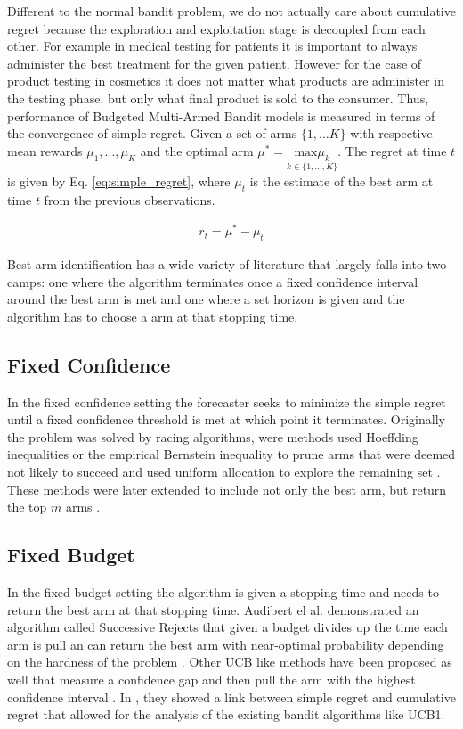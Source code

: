 \documentclass[letterpaper, 10 pt, conference]{ieeeconf}  %
\begin{document}
Different to the normal bandit problem, we do not actually care about cumulative regret because the exploration and exploitation stage is decoupled from each other. For example in medical testing for patients it is important to always administer the best treatment for the given patient. However for the case of product testing in cosmetics it does not matter what products are administer in the testing phase, but only what final product is sold to the consumer. Thus, performance of Budgeted Multi-Armed Bandit models is measured in terms of the convergence of simple regret. Given a set of arms $\lbrace 1,...K \rbrace$ with respective mean rewards $\mu_1, ..., \mu_K$ and the optimal arm $\mu^* = \underset{k\in\lbrace 1, ..., K \rbrace}{\mbox{max}\mu_k}$. The regret at time $t$ is given by Eq. \ref{eq:simple_regret}, where $\mu_t$ is the estimate of the best arm at time $t$ from the previous observations. 

\vspace{-2ex}
\begin{align}\label{eq:simple_regret}
r_t = \mu^* - \mu_t
\end{align}

Best arm identification has a wide variety of literature that largely falls into two camps: one where the algorithm terminates once a fixed confidence interval around the best arm is met and one where a set horizon is given and the algorithm has to choose a arm at that stopping time.

\subsection{Fixed Confidence}
In the fixed confidence setting the forecaster seeks to minimize the simple regret until a fixed confidence threshold is met at which point it terminates. Originally the problem was solved by racing algorithms, were methods used Hoeffding inequalities or the empirical Bernstein inequality to prune arms that were deemed not likely to succeed and used uniform allocation to explore the remaining set \cite{maron1993hoeffding} \cite{mnih2008empirical}. These methods were later extended to include not only the best arm, but return the top $m$ arms \cite{gabillon2012best}.

\subsection{Fixed Budget}
In the fixed budget setting the algorithm is given a stopping time and needs to return the best arm at that stopping time. Audibert el al. demonstrated an algorithm called Successive Rejects that given a budget divides up the time each arm is pull an can return the best arm with near-optimal probability depending on the hardness of the problem \cite{audibert2010best}. Other UCB like methods have been proposed as well that measure a confidence gap and then pull the arm with the highest confidence interval \cite{gabillon2012best}. In \cite{bubeck2009pure}, they showed a link between simple regret and cumulative regret that allowed for the analysis of the existing bandit algorithms like UCB1.
\end{document}
